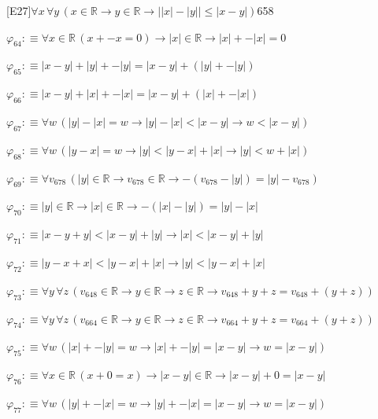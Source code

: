 \begin{fullproof}{[E27]}{$\forall x\,\forall y\,(x \in \mathbb{R} \to y \in \mathbb{R} \to \lvert \lvert x \rvert - \lvert y \rvert \rvert \leq \lvert x - y \rvert)$}{658}
\begin{abbrevlist}
\item $\varphi_{64} :\equiv \forall x \in \mathbb{R}\,(x + -x = 0) \to \lvert x \rvert \in \mathbb{R} \to \lvert x \rvert + -\lvert x \rvert = 0$
\item $\varphi_{65} :\equiv \lvert x - y \rvert + \lvert y \rvert + -\lvert y \rvert = \lvert x - y \rvert + (\lvert y \rvert + -\lvert y \rvert)$
\item $\varphi_{66} :\equiv \lvert x - y \rvert + \lvert x \rvert + -\lvert x \rvert = \lvert x - y \rvert + (\lvert x \rvert + -\lvert x \rvert)$
\item $\varphi_{67} :\equiv \forall w\,(\lvert y \rvert - \lvert x \rvert = w \to \lvert y \rvert - \lvert x \rvert < \lvert x - y \rvert \to w < \lvert x - y \rvert)$
\item $\varphi_{68} :\equiv \forall w\,(\lvert y - x \rvert = w \to \lvert y \rvert < \lvert y - x \rvert + \lvert x \rvert \to \lvert y \rvert < w + \lvert x \rvert)$
\item $\varphi_{69} :\equiv \forall v_{678}\,(\lvert y \rvert \in \mathbb{R} \to v_{678} \in \mathbb{R} \to -(v_{678} - \lvert y \rvert) = \lvert y \rvert - v_{678})$
\item $\varphi_{70} :\equiv \lvert y \rvert \in \mathbb{R} \to \lvert x \rvert \in \mathbb{R} \to -(\lvert x \rvert - \lvert y \rvert) = \lvert y \rvert - \lvert x \rvert$
\item $\varphi_{71} :\equiv \lvert x - y + y \rvert < \lvert x - y \rvert + \lvert y \rvert \to \lvert x \rvert < \lvert x - y \rvert + \lvert y \rvert$
\item $\varphi_{72} :\equiv \lvert y - x + x \rvert < \lvert y - x \rvert + \lvert x \rvert \to \lvert y \rvert < \lvert y - x \rvert + \lvert x \rvert$
\item $\varphi_{73} :\equiv \forall y\,\forall z\,(v_{648} \in \mathbb{R} \to y \in \mathbb{R} \to z \in \mathbb{R} \to v_{648} + y + z = v_{648} + (y + z))$
\item $\varphi_{74} :\equiv \forall y\,\forall z\,(v_{664} \in \mathbb{R} \to y \in \mathbb{R} \to z \in \mathbb{R} \to v_{664} + y + z = v_{664} + (y + z))$
\item $\varphi_{75} :\equiv \forall w\,(\lvert x \rvert + -\lvert y \rvert = w \to \lvert x \rvert + -\lvert y \rvert = \lvert x - y \rvert \to w = \lvert x - y \rvert)$
\item $\varphi_{76} :\equiv \forall x \in \mathbb{R}\,(x + 0 = x) \to \lvert x - y \rvert \in \mathbb{R} \to \lvert x - y \rvert + 0 = \lvert x - y \rvert$
\item $\varphi_{77} :\equiv \forall w\,(\lvert y \rvert + -\lvert x \rvert = w \to \lvert y \rvert + -\lvert x \rvert = \lvert x - y \rvert \to w = \lvert x - y \rvert)$

\end{abbrevlist}
\end{fullproof}
